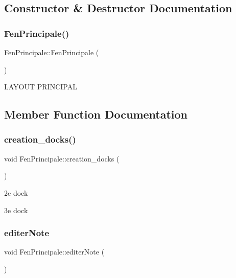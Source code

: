 \subsection{Constructor \& Destructor Documentation}
\mbox{\label{class_fen_principale_a529a35ea032da250ad37f7355d1388be}} 
\subsubsection{\texorpdfstring{Fen\+Principale()}{FenPrincipale()}}
{\footnotesize\ttfamily Fen\+Principale\+::\+Fen\+Principale (\begin{DoxyParamCaption}{ }\end{DoxyParamCaption})}

L\+A\+Y\+O\+UT P\+R\+I\+N\+C\+I\+P\+AL 

\subsection{Member Function Documentation}
\mbox{\label{class_fen_principale_ab3ef99b1adb06c0bcc57ea74ca34923e}} 
\subsubsection{\texorpdfstring{creation\+\_\+docks()}{creation\_docks()}}
{\footnotesize\ttfamily void Fen\+Principale\+::creation\+\_\+docks (\begin{DoxyParamCaption}{ }\end{DoxyParamCaption})\hspace{0.3cm}{\ttfamily [protected]}}

2e dock

3e dock \mbox{\label{class_fen_principale_ab8b916f06d0c149b1411781e7129fab5}} 
\subsubsection{\texorpdfstring{editer\+Note}{editerNote}}
{\footnotesize\ttfamily void Fen\+Principale\+::editer\+Note (\begin{DoxyParamCaption}{ }\end{DoxyParamCaption})\hspace{0.3cm}{\ttfamily [slot]}}

